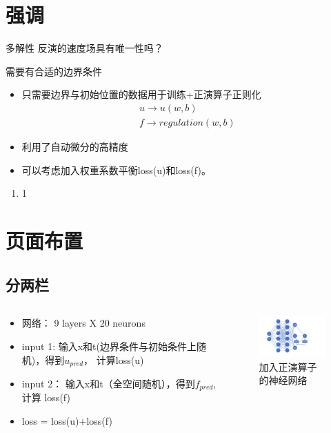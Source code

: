 \section{强调}
\begin{frame}{\secname}
	\begin{block}{多解性}
		反演的速度场具有唯一性吗？
	
		\qquad
	

		需要有合适的边界条件	
	\end{block}
	\begin{itemize}
		\item 只需要边界与初始位置的数据用于训练+正演算子正则化
		\begin{gather*}
			u \longrightarrow u(w,b)\\
			f \longrightarrow regulation (w,b)
		\end{gather*}

		\item 利用了自动微分的高精度
		\item 可以考虑加入权重系数平衡loss(u)和loss(f)。

	\end{itemize}
	\begin{enumerate}
		\item 1
	\end{enumerate}
\end{frame}

\section{页面布置}
\subsection{分两栏}
\begin{frame}{\secname}
	\begin{columns}
		\begin{column}{0.6\linewidth}
			\begin{itemize}
			\item 网络： 9 layers X 20 neurons 
			\item input 1: 输入x和t(边界条件与初始条件上随机)，得到$u_{pred}$， 计算loss(u) 
			\item input 2： 输入x和t（全空间随机），得到$f_{pred}$, 计算 loss(f) 
			\item loss = loss(u)+loss(f)
			\end{itemize}
		\end{column}
		
		\begin{column}{0.45\linewidth}
			\begin{figure}[h]
				\centering
				\includegraphics[width=5cm]{./imags/flower.png}
				\caption{加入正演算子的神经网络}
			\end{figure}
		\end{column}
	\end{columns}
\end{frame}
